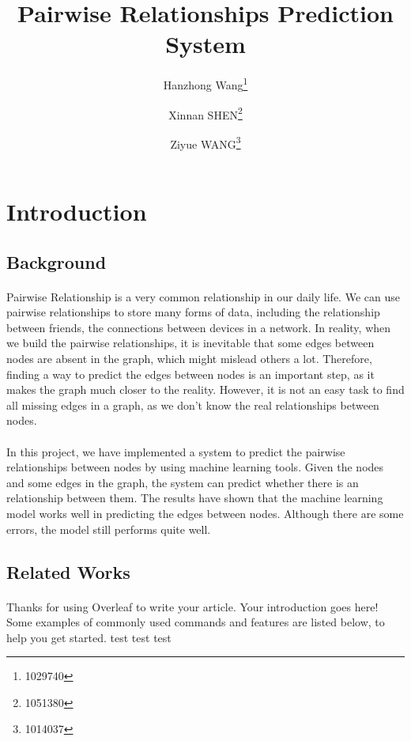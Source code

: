 \documentclass[fleqn,11pt]{olplainarticle}
\title{Pairwise Relationships Prediction System}
\author{Hanzhong Wang\thanks{1029740}}
\author{Xinnan SHEN\thanks{1051380}}
\author{Ziyue WANG\thanks{1014037}}
\affil{School of Computing and Information Systems, University of Melbourne}
\affil[]{\textit{\{hanzhongw,xinnan.shen, ziyue2\}}@student.unimelb.edu.au}
\begin{document}
\maketitle
\flushbottom
\thispagestyle{empty}
\pagestyle{empty}


\section{Introduction}\label{intro}

\subsection{Background}\label{bgd}
\paragraph*{}
Pairwise Relationship is a very common relationship in our daily life. We can use pairwise relationships to store many forms of data, including the relationship between friends, the connections between devices in a network. In reality, when we build the pairwise relationships, it is inevitable that some edges between nodes are absent in the graph, which might mislead others a lot. Therefore, finding a way to predict the edges between nodes is an important step, as it makes the graph much closer to the reality. However, it is not an easy task to find all missing edges in a graph, as we don't know the real relationships between nodes. 
\paragraph*{}
In this project, we have implemented a system to predict the pairwise relationships between nodes by using machine learning tools. Given the nodes and some edges in the graph, the system can predict whether there is an relationship between them. The results have shown that the machine learning model works well in predicting the edges between nodes. Although there are some errors, the model still performs quite well.

\subsection{Related Works}\label{relaw}
\paragraph{}
Thanks for using Overleaf to write your article. Your introduction goes here! Some examples of commonly used commands and features are listed below, to help you get started. test \cite{liben2007link} test \cite{lu2011link} test
\end{document}
